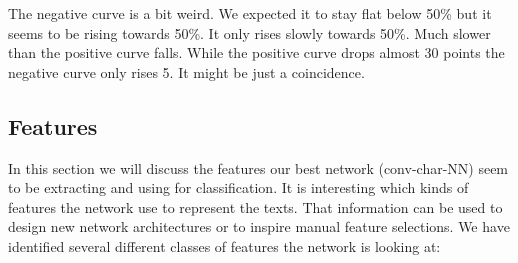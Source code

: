 The negative curve is a bit weird. We expected it to stay flat below 50\% but
it seems to be rising towards 50\%. It only rises slowly towards 50\%. Much
slower than the positive curve falls. While the positive curve drops almost 30
points the negative curve only rises 5. It might be just a coincidence.


\subsection{Features}

In this section we will discuss the features our best network
(\gls{conv-char-NN}) seem to be extracting and using for classification. It is
interesting which kinds of features the network use to represent the texts. That
information can be used to design new network architectures or to inspire manual
feature selections. We have identified several different classes of features the
network is looking at:

